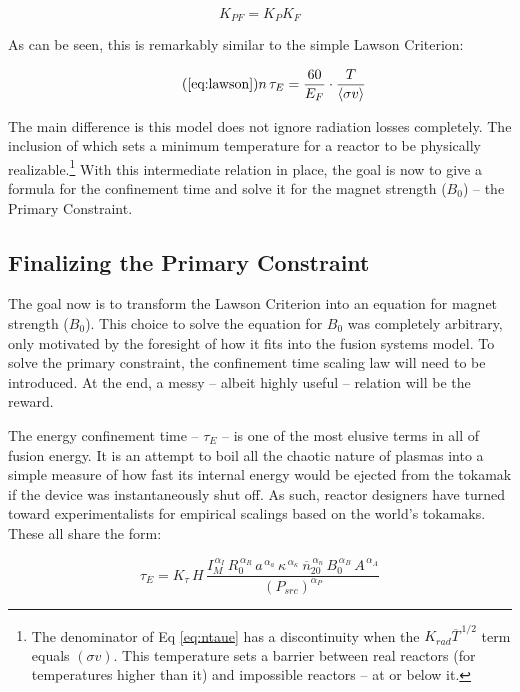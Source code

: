 \documentclass[11pt]{book}
\begin{document}
\begin{equation}
	K_{PF} = K_P K_F
\end{equation}

As can be seen, this is remarkably similar to the simple Lawson Criterion:

\begin{equation}
	\tag{\ref{eq:lawson}}
	n \, \tau_E = \frac{ 60 }{ E_F } \cdot \frac{ T }{ \langle \sigma v \rangle }
\end{equation} 

The main difference is this model does not ignore radiation losses completely. The inclusion of which sets a minimum temperature for a reactor to be physically realizable.\footnote{ The denominator of Eq \ref{eq:ntaue} has a discontinuity when the $K_{rad} \overline T ^ {\,1/2}$ term equals $( \sigma v )$. This temperature sets a barrier between real reactors (for temperatures higher than it) and impossible reactors -- at or below it.} With this intermediate relation in place, the goal is now to give a formula for the confinement time and solve it for the magnet strength ($B_0$) -- the Primary Constraint.

\subsection{Finalizing the Primary Constraint}

The goal now is to transform the Lawson Criterion into an equation for magnet strength ($B_0$). This choice to solve the equation for $B_0$ was completely arbitrary, only motivated by the foresight of how it fits into the fusion systems model. To solve the primary constraint, the confinement time scaling law will need to be introduced. At the end, a messy -- albeit highly useful -- relation will be the reward.

The energy confinement time -- $\tau_E$ -- is one of the most elusive terms in all of fusion energy. It is an attempt to boil all the chaotic nature of plasmas into a simple measure of how fast its internal energy would be ejected from the tokamak if the device was instantaneously shut off. As such, reactor designers have turned toward experimentalists for empirical scalings based on the world's tokamaks. These all share the form:

\begin{equation}
	\tau_E = K_\tau \, H \, \frac{
		I_M^{\,\alpha_I} \, R_0^{\,\alpha_R} \, a^{\,\alpha_a} \, \kappa^{\,\alpha_\kappa} \ \overline{n}_{20}^{\,\alpha_n} \, B_0^{\,\alpha_B} \, A^{\,\alpha_A}
	}{ ( P_{src} ) ^ {\alpha_P} }
\end{equation}
\end{document}
